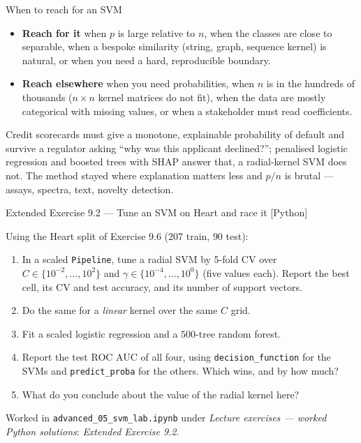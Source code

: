 \documentclass[aspectratio=169,11pt]{beamer}
\begin{document}
\begin{frame}{When to reach for an SVM}
  \footnotesize
  \begin{readme}
    \begin{itemize}
      \item \textbf{Reach for it} when $p$ is large relative to $n$, when the
            classes are close to separable, when a bespoke similarity (string,
            graph, sequence kernel) is natural, or when you need a hard,
            reproducible boundary.
      \item \textbf{Reach elsewhere} when you need probabilities, when $n$ is
            in the hundreds of thousands ($n\times n$ kernel matrices do not
            fit), when the data are mostly categorical with missing values, or
            when a stakeholder must read coefficients.
    \end{itemize}
  \end{readme}
  \begin{takeaway}
    Credit scorecards must give a monotone, explainable probability of default
    and survive a regulator asking ``why was this applicant declined?'';
    penalised logistic regression and boosted trees with SHAP answer that, a
    radial-kernel SVM does not. The method stayed where explanation matters
    less and $p/n$ is brutal --- assays, spectra, text, novelty detection.
  \end{takeaway}
\end{frame}

\begin{frame}{Extended Exercise 9.2 --- Tune an SVM on Heart and race it [Python]}
\begin{longexercise}
  Using the Heart split of Exercise 9.6 ($207$ train, $90$ test):
  \begin{enumerate}
    \item In a scaled \texttt{Pipeline}, tune a radial SVM by 5-fold CV over
          $C\in\{10^{-2},\dots,10^{2}\}$ and
          $\gamma\in\{10^{-4},\dots,10^{0}\}$ (five values each). Report the
          best cell, its CV and test accuracy, and its number of support
          vectors.
    \item Do the same for a \emph{linear} kernel over the same $C$ grid.
    \item Fit a scaled logistic regression and a $500$-tree random forest.
    \item Report the test ROC AUC of all four, using
          \texttt{decision\_function} for the SVMs and
          \texttt{predict\_proba} for the others. Which wins, and by how much?
    \item What do you conclude about the value of the radial kernel here?
  \end{enumerate}
\end{longexercise}
\begin{labnote}
  Worked in \texttt{advanced\_05\_svm\_lab.ipynb} under \emph{Lecture exercises
  --- worked Python solutions}: \emph{Extended Exercise 9.2}.
\end{labnote}
\end{frame}
\end{document}
